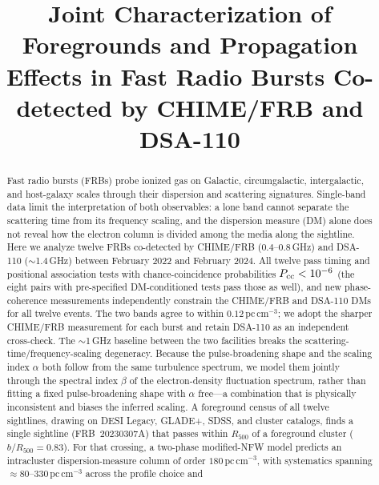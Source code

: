 \documentclass[twocolumn]{aastex631}
\begin{document}
\title{Joint Characterization of Foregrounds and Propagation Effects in Fast Radio Bursts Co-detected by CHIME/FRB and DSA-110}



\begin{abstract}
Fast radio bursts (FRBs) probe ionized gas on Galactic, circumgalactic,
intergalactic, and host-galaxy scales through their dispersion and scattering
signatures. Single-band data limit the interpretation of both observables: a
lone band cannot separate the scattering time from its frequency scaling, and
the dispersion measure (DM) alone does not reveal how the electron column is
divided among the media along the sightline. Here we analyze twelve FRBs
co-detected by CHIME/FRB ($0.4$--$0.8$\,GHz) and DSA-110 ($\sim$1.4\,GHz)
between February 2022 and February 2024. All twelve pass timing and positional
association tests with chance-coincidence probabilities $P_{\rm cc}<10^{-6}$
(the eight pairs with pre-specified DM-conditioned tests pass those as well),
and new phase-coherence measurements independently constrain the CHIME/FRB
and DSA-110 DMs for all twelve events. The two bands agree to within
$0.12\,\mathrm{pc\,cm^{-3}}$; we adopt the sharper CHIME/FRB measurement for
each burst and retain DSA-110 as an independent cross-check. The
$\sim$1\,GHz baseline between the two facilities breaks the
scattering-time/frequency-scaling degeneracy. Because the pulse-broadening shape and the scaling
index $\alpha$ both follow from the same turbulence spectrum, we model them
jointly through the spectral index $\beta$ of the electron-density fluctuation
spectrum, rather than fitting a fixed pulse-broadening shape with $\alpha$
free---a combination that is physically inconsistent and biases the inferred
scaling.
A foreground census of all twelve sightlines, drawing on DESI Legacy, GLADE+,
SDSS, and cluster catalogs, finds a single sightline
(FRB~20230307A) that passes within $R_{500}$ of a foreground cluster
($b/R_{500}=0.83$). For that crossing, a two-phase modified-NFW model predicts
an intracluster dispersion-measure column of order
$180\,\mathrm{pc\,cm^{-3}}$, with systematics spanning
$\approx80$--$330\,\mathrm{pc\,cm^{-3}}$ across the profile choice and

\end{abstract}
\end{document}
